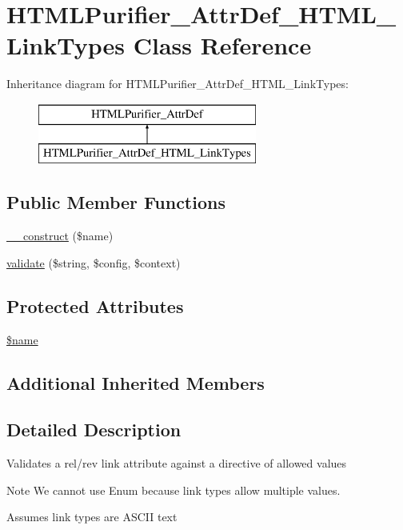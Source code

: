 \hypertarget{classHTMLPurifier__AttrDef__HTML__LinkTypes}{\section{H\+T\+M\+L\+Purifier\+\_\+\+Attr\+Def\+\_\+\+H\+T\+M\+L\+\_\+\+Link\+Types Class Reference}
\label{classHTMLPurifier__AttrDef__HTML__LinkTypes}
}
Inheritance diagram for H\+T\+M\+L\+Purifier\+\_\+\+Attr\+Def\+\_\+\+H\+T\+M\+L\+\_\+\+Link\+Types\+:\begin{figure}[H]
\begin{center}
\leavevmode
\includegraphics[height=2.000000cm]{classHTMLPurifier__AttrDef__HTML__LinkTypes}
\end{center}
\end{figure}
\subsection*{Public Member Functions}
\begin{DoxyCompactItemize}
\item 
\hyperlink{classHTMLPurifier__AttrDef__HTML__LinkTypes_a8ec7c1772a9e4518c7d88fff81414faa}{\+\_\+\+\_\+construct} (\$name)
\item 
\hyperlink{classHTMLPurifier__AttrDef__HTML__LinkTypes_ab1e067c121979d1b63125e16646cf1b1}{validate} (\$string, \$config, \$context)
\end{DoxyCompactItemize}
\subsection*{Protected Attributes}
\begin{DoxyCompactItemize}
\item 
\hyperlink{classHTMLPurifier__AttrDef__HTML__LinkTypes_a0b1b0d672fe9e3ee3fe23472243b1bf9}{\$name}
\end{DoxyCompactItemize}
\subsection*{Additional Inherited Members}


\subsection{Detailed Description}
Validates a rel/rev link attribute against a directive of allowed values \begin{DoxyNote}{Note}
We cannot use Enum because link types allow multiple values. 

Assumes link types are A\+S\+C\+I\+I text 
\end{DoxyNote}


